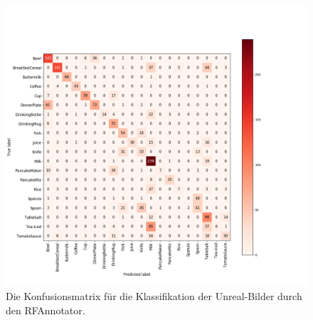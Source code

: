\begin{figure}
	\includegraphics[scale=.5]{img/chapter6/classifierRFconf_matrix.png}
\caption[Ergebnisse der Klassifizierung durch den RFAnnotators]{Die Konfusionsmatrix für die Klassifikation der Unreal-Bilder durch den RFAnnotator.}
\label{fig:classi_Ex_confMatrix}
\end{figure}

